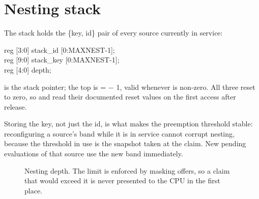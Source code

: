 \section{Nesting stack}

The stack holds the \{key, id\} pair of every source currently in service:

\begin{center}
\ttfamily\small
reg [3:0] stack\_id  [0:MAXNEST-1];\\
reg [9:0] stack\_key [0:MAXNEST-1];\\
reg [4:0] depth;
\end{center}

 is the stack pointer; the top is  =  $-$ 1,
valid whenever  is non-zero. All three reset to zero, so
 and  read their documented reset values on
the first access after release.

Storing the key, not just the id, is what makes the preemption threshold stable:
reconfiguring a source's band while it is in service cannot corrupt nesting,
because the threshold in use is the snapshot taken at the claim. New pending
evaluations of that source use the new band immediately.

\begin{figure}[H]
\centering
{}
\caption{Nesting depth. The limit is enforced by masking offers, so a claim that
would exceed it is never presented to the CPU in the first place.}
\label{fig:picdepth}
\end{figure}

